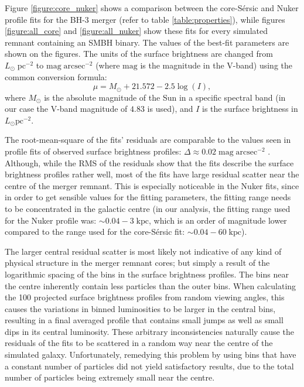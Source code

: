 \documentclass[english, oneside]{HYgradu}
\begin{document}
Figure \ref{figure:core_nuker} shows a comparison between the core-Sérsic and Nuker profile fits for the BH-3 merger (refer to table \ref{table:properties}), while figures \ref{figure:all_core} and \ref{figure:all_nuker} show these fits for every simulated remnant containing an SMBH binary. The values of the best-fit parameters are shown on the figures. The units of the surface brightness are changed from $L_\odot \; \mathrm{pc^{-2}}$ to $\mathrm{mag \; arcsec^{-2}}$ (where $\mathrm{mag}$ is the magnitude in the V-band) using the common conversion formula:
\begin{equation}
\mu = M_\odot + 21.572 - 2.5 \log(I), 
\end{equation}
where $M_\odot$ is the absolute magnitude of the Sun in a specific spectral band (in our case the V-band magnitude of $4.83$ is used), and $I$ is the surface brightness in $L_\odot \mathrm{pc^{-2}}$.

The root-mean-square of the fits' residuals are comparable to the values seen in profile fits of observed surface brightness profiles: $\Delta \approx 0.02 \; \mathrm{mag \; arcsec^{-2}}$ \citep{Dullo2012}. Although, while the RMS of the residuals show that the fits describe the surface brightness profiles rather well, most of the fits have large residual scatter near the centre of the merger remnant. This is especially noticeable in the Nuker fits, since in order to get sensible values for the fitting parameters, the fitting range needs to be concentrated in the galactic centre (in our analysis, the fitting range used for the Nuker profile was: $\sim 0.04 - 3 \; \mathrm{kpc}$, which is an order of magnitude lower compared to the range used for the core-Sérsic fit: $\sim 0.04 - 60 \; \mathrm{kpc}$). 

The larger central residual scatter is most likely not indicative of any kind of physical structure in the merger remnant cores; but simply a result of the logarithmic spacing of the bins in the surface brightness profiles. The bins near the centre inherently contain less particles than the outer bins. When calculating the 100 projected surface brightness profiles from random viewing angles, this causes the variations in binned luminosities to be larger in the central bins, resulting in a final averaged profile that contains small jumps as well as small dips in its central luminosity. These arbitrary inconsistencies naturally cause the residuals of the fits to be scattered in a random way near the centre of the simulated galaxy. Unfortunately, remedying this problem by using bins that have a constant number of particles did not yield satisfactory results, due to the total number of particles being extremely small near the centre.
\end{document}
